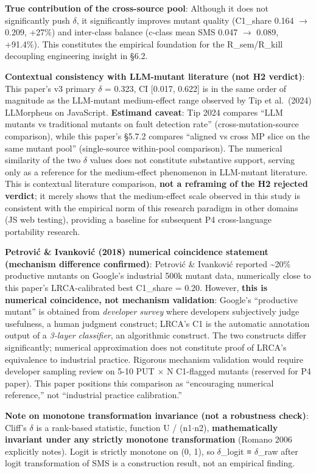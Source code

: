 \documentclass[review,12pt,authoryear]{elsarticle}
\begin{document}
\textbf{True contribution of the cross-source pool}: Although it does
not significantly push $\delta$, it significantly improves mutant quality
(C1\_share 0.164 $\to$ 0.209, +27\%) and inter-class balance (c-class mean
SMS 0.047 $\to$ 0.089, +91.4\%). This constitutes the empirical foundation
for the R\_sem/R\_kill decoupling engineering insight in §6.2.

\textbf{Contextual consistency with LLM-mutant literature (not H2
verdict)}: This paper's v3 primary $\delta$ = 0.323, CI {[}0.017, 0.622{]} is
in the same order of magnitude as the LLM-mutant medium-effect range
observed by Tip et al.~(2024) LLMorpheus on JavaScript. \textbf{Estimand
caveat}: Tip 2024 compares ``LLM mutants vs traditional mutants on fault
detection rate'' (cross-mutation-source comparison), while this paper's
§5.7.2 compares ``aligned vs cross MP slice on the same mutant pool''
(single-source within-pool comparison). The numerical similarity of the
two $\delta$ values does not constitute substantive support, serving only as a
reference for the medium-effect phenomenon in LLM-mutant literature.
This is contextual literature comparison, \textbf{not a reframing of the
H2 rejected verdict}; it merely shows that the medium-effect scale
observed in this study is consistent with the empirical norm of this
research paradigm in other domains (JS web testing), providing a
baseline for subsequent P4 cross-language portability research.

\textbf{Petrović \& Ivanković (2018) numerical coincidence statement
(mechanism difference confirmed)}: Petrović \& Ivanković reported
\textasciitilde20\% productive mutants on Google's industrial 500k
mutant data, numerically close to this paper's LRCA-calibrated best
C1\_share = 0.20. However, \textbf{this is numerical coincidence, not
mechanism validation}: Google's ``productive mutant'' is obtained from
\emph{developer survey} where developers subjectively judge usefulness,
a human judgment construct; LRCA's C1 is the automatic annotation output
of a \emph{3-layer classifier}, an algorithmic construct. The two
constructs differ significantly; numerical approximation does not
constitute proof of LRCA's equivalence to industrial practice. Rigorous
mechanism validation would require developer sampling review on 5-10 PUT
$\times$ N C1-flagged mutants (reserved for P4 paper). This paper positions
this comparison as ``encouraging numerical reference,'' not ``industrial
practice calibration.''

\textbf{Note on monotone transformation invariance (not a robustness
check)}: Cliff's $\delta$ is a rank-based statistic, function U / (n1$\cdot$n2),
\textbf{mathematically invariant under any strictly monotone
transformation} (Romano 2006 explicitly notes). Logit is strictly
monotone on (0, 1), so $\delta$\_logit ≡ $\delta$\_raw after logit transformation of
SMS is a construction result, not an empirical finding.
\end{document}

